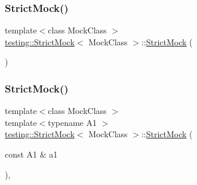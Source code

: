 \subsubsection{\texorpdfstring{StrictMock()}{StrictMock()}\hspace{0.1cm}{\footnotesize\ttfamily [1/11]}}
{\footnotesize\ttfamily template$<$class Mock\+Class $>$ \\
\mbox{\hyperlink{classtesting_1_1StrictMock}{testing\+::\+Strict\+Mock}}$<$ Mock\+Class $>$\+::\mbox{\hyperlink{classtesting_1_1StrictMock}{Strict\+Mock}} (\begin{DoxyParamCaption}{ }\end{DoxyParamCaption})\hspace{0.3cm}{\ttfamily [inline]}}

\mbox{\label{classtesting_1_1StrictMock_a42db27ba0af29804db8589676817aff8}} 
\subsubsection{\texorpdfstring{StrictMock()}{StrictMock()}\hspace{0.1cm}{\footnotesize\ttfamily [2/11]}}
{\footnotesize\ttfamily template$<$class Mock\+Class $>$ \\
template$<$typename A1 $>$ \\
\mbox{\hyperlink{classtesting_1_1StrictMock}{testing\+::\+Strict\+Mock}}$<$ Mock\+Class $>$\+::\mbox{\hyperlink{classtesting_1_1StrictMock}{Strict\+Mock}} (\begin{DoxyParamCaption}\item[{const A1 \&}]{a1 }\end{DoxyParamCaption})\hspace{0.3cm}{\ttfamily [inline]}, {\ttfamily [explicit]}}

\mbox{\label{classtesting_1_1StrictMock_a345933f3f1a10de381a508f93e680c6b}} 
